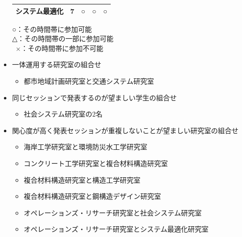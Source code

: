 \documentclass[a4paper,12pt,fleqn]{jarticle}
\begin{document}
\begin{itemize}
\begin{table}[H]
\begin{center}
\begin{tabular}{lrrrr}
        システム最適化 & 7  & ○ & ○ & ○\\ \bottomrule
      \end{tabular}
    \end{center}
    \hspace{1cm} ○：その時間帯に参加可能 \\
    \hspace{1cm} △：その時間帯の一部に参加可能\\
    \hspace{0.94cm} \ $\times$：その時間帯に参加不可能
  \end{table}
\item 一体運用する研究室の組合せ
\begin{itemize}
\item 都市地域計画研究室と交通システム研究室
\end{itemize}
\item 同じセッションで発表するのが望ましい学生の組合せ
\begin{itemize}
\item 社会システム研究室の$2$名
\end{itemize}
\item 関心度が高く発表セッションが重複しないことが望ましい研究室の組合せ
\begin{itemize}
\item 海岸工学研究室と環境防災水工学研究室
\item コンクリート工学研究室と複合材料構造研究室
\item 複合材料構造研究室と構造工学研究室
\item 複合材料構造研究室と鋼構造デザイン研究室
\item オペレーションズ・リサーチ研究室と社会システム研究室
\item オペレーションズ・リサーチ研究室とシステム最適化研究室
\end{itemize}
\end{itemize}
\end{document}
